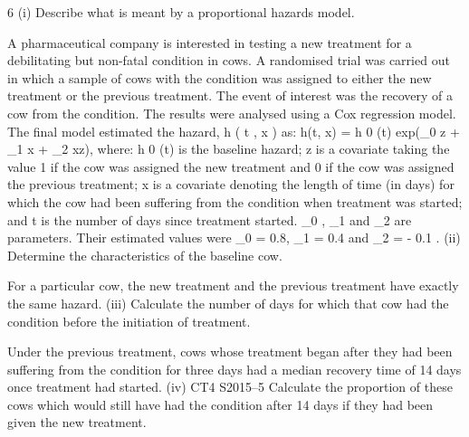 \documentclass[a4paper,12pt]{article}
\begin{document}
6
(i)
Describe what is meant by a proportional hazards model.

A pharmaceutical company is interested in testing a new treatment for a debilitating
but non-fatal condition in cows. A randomised trial was carried out in which a sample
of cows with the condition was assigned to either the new treatment or the previous
treatment. The event of interest was the recovery of a cow from the condition. The
results were analysed using a Cox regression model.
The final model estimated the hazard, h ( t , x ) as:
h(t, x) = h 0 (t) exp(\beta_0 z + \beta_1 x + \beta_2 xz),
where:
h 0 (t) is the baseline hazard;
z is a covariate taking the value 1 if the cow was assigned the new treatment and 0 if
the cow was assigned the previous treatment;
x is a covariate denoting the length of time (in days) for which the cow had been
suffering from the condition when treatment was started;
and t is the number of days since treatment started.
\beta_0 , \beta_1 and \beta_2 are parameters. Their estimated values were \beta_0 = 0.8, \beta_1 = 0.4
and \beta_2 = - 0.1 .
(ii)
Determine the characteristics of the baseline cow.

For a particular cow, the new treatment and the previous treatment have exactly the
same hazard.
(iii)
Calculate the number of days for which that cow had the condition before the
initiation of treatment.

Under the previous treatment, cows whose treatment began after they had been
suffering from the condition for three days had a median recovery time of 14 days
once treatment had started.
(iv)
CT4 S2015–5
Calculate the proportion of these cows which would still have had the
condition after 14 days if they had been given the new treatment.
\end{document}
